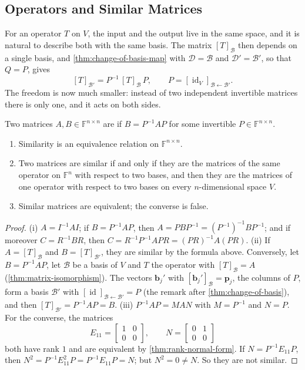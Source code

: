 \subsection{Operators and Similar Matrices}

For an operator $T$ on $V$, the input and the output live in the same space, and it is natural to describe both with the same basis. The matrix $[T]_{\mathcal B}$ then depends on a single basis, and \cref{thm:change-of-basis-map} with $\mathcal D=\mathcal B$ and $\mathcal D'=\mathcal B'$, so that $Q=P$, gives
\[
[T]_{\mathcal B'}=P^{-1}\,[T]_{\mathcal B}\,P,\qquad P=[\operatorname{id}_V]_{\mathcal B\leftarrow\mathcal B'} .
\]
The freedom is now much smaller: instead of two independent invertible matrices there is only one, and it acts on both sides.

\begin{definition}
\label{def:similar}
Two matrices $A,B\in\mathbb F^{n\times n}$ are  if $B=P^{-1}AP$ for some invertible $P\in\mathbb F^{n\times n}$.
\end{definition}

\begin{proposition}[Similarity]
\label{prop:similarity}
\leavevmode
\begin{enumerate}
\item Similarity is an equivalence relation on $\mathbb F^{n\times n}$.
\item Two matrices are similar if and only if they are the matrices of the same operator on $\mathbb F^n$ with respect to two bases, and then they are the matrices of one operator with respect to two bases on every $n$-dimensional space $V$.
\item Similar matrices are equivalent; the converse is false.
\end{enumerate}
\end{proposition}

\begin{proof}
(i) $A=I^{-1}AI$; if $B=P^{-1}AP$, then $A=PBP^{-1}=(P^{-1})^{-1}BP^{-1}$; and if moreover $C=R^{-1}BR$, then $C=R^{-1}P^{-1}APR=(PR)^{-1}A(PR)$. (ii) If $A=[T]_{\mathcal B}$ and $B=[T]_{\mathcal B'}$, they are similar by the formula above. Conversely, let $B=P^{-1}AP$, let $\mathcal B$ be a basis of $V$ and $T$ the operator with $[T]_{\mathcal B}=A$ (\cref{thm:matrix-isomorphism}). The vectors $\mathbf b_j'$ with $[\mathbf b_j']_{\mathcal B}=\mathbf p_j$, the columns of $P$, form a basis $\mathcal B'$ with $[\operatorname{id}]_{\mathcal B\leftarrow\mathcal B'}=P$ (the remark after \cref{thm:change-of-basis}), and then $[T]_{\mathcal B'}=P^{-1}AP=B$. (iii) $P^{-1}AP=MAN$ with $M=P^{-1}$ and $N=P$. For the converse, the matrices
\[
E_{11}=\begin{bmatrix}1&0\\0&0\end{bmatrix},\qquad N=\begin{bmatrix}0&1\\0&0\end{bmatrix}
\]
both have rank $1$ and are equivalent by \cref{thm:rank-normal-form}. If $N=P^{-1}E_{11}P$, then $N^2=P^{-1}E_{11}^2P=P^{-1}E_{11}P=N$; but $N^2=0\ne N$. So they are not similar.
\end{proof}


